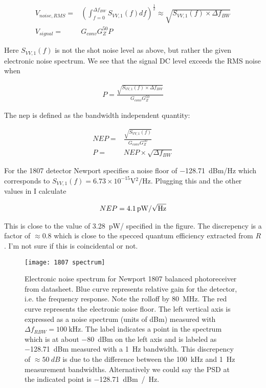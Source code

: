 \documentclass[12pt]{article}
\begin{document}
\begin{align}
V_{noise,RMS} =& \left(\int_{f=0}^{\Delta f_{BW}} S_{VV,1}(f) df\right)^{\frac{1}{2}} \approx \sqrt{S_{VV,1}(f)\times \Delta f_{BW}}\\
V_{signal} =& G_{conv} G_Z^{50} P
\end{align}

Here $S_{VV,1}(f)$ is not the shot noise level as above, but rather the given electronic noise spectrum.
We see that the signal DC level exceeds the RMS noise when

\begin{align}
P = \frac{\sqrt{S_{VV,1}(f)\times \Delta f_{BW}}}{G_{conv}G_Z^{50}}
\end{align}

The \gls{nep} is defined as the bandwidth independent quantity:

\begin{align}
NEP =& \frac{\sqrt{S_{VV,1}(f)}}{G_{conv}G_Z^{50}}\\
P =& NEP \times \sqrt{\Delta f_{BW}}
\end{align}

For the 1807 detector Newport specifies a noise floor of \SI{-128.71}{dBm/\Hz} which corresponds to $S_{VV,1}(f) = 6.73 \times 10^{-15} \si{\V^2 / \Hz}$.
Plugging this and the other values in I calculate

\begin{align}
NEP = \SI{4.1}{\pico \watt / \sqrt{\Hz}}
\end{align}

This is close to the value of \SI{3.28}{\pico \watt / \sqrt{\Hz}} specified in the figure.
The discrepency is a factor of $\approx 0.8$ which is close to the specced quantum efficiency extracted from $R$.
I'm not sure if this is coincidental or not.

\begin{figure}[H] 
\centering
\texttt{[image: 1807 spectrum]}
\caption{Electronic noise spectrum for Newport 1807 balanced photoreceiver from datasheet. Blue curve represents relative gain for the detector, i.e. the frequency response. Note the rolloff by \SI{80}{\MHz}. The red curve represents the electronic noise floor. The left vertical axis is expressed as a noise spectrum (units of dBm) measured with $\Delta f_{RBW} = \SI{100}{\kHz}$. The label indicates a point in the spectrum which is at about \SI{-80}{dBm} on the left axis and is labeled as \SI{-128.71}{dBm} measured with a \SI{1}{\Hz} bandwidth. This discrepency of $\approx \SI{50}{dB}$ is due to the difference between the \SI{100}{\kHz} and \SI{1}{\Hz} measurement bandwidths. Alternatively we could say the PSD at the indicated point is \SI{-128.71}{dBm / \Hz}.}
\end{figure}
\end{document}
